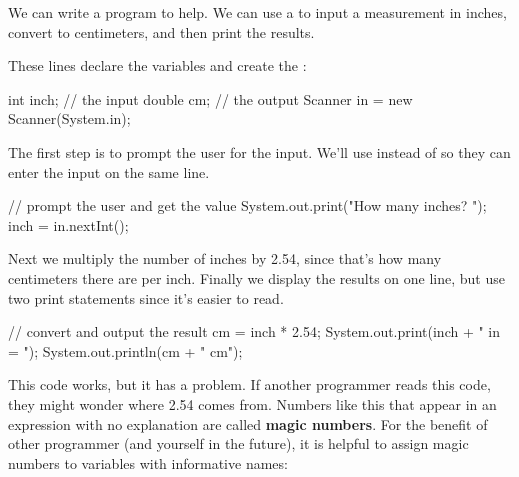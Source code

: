 
We can write a program to help.  We can use a  to 
input a measurement in inches, convert to centimeters, and then print
the results.

These lines declare the variables and create the :



\begin{code}
    int inch;  // the input
    double cm;  // the output
    Scanner in = new Scanner(System.in);
\end{code}

The first step is to prompt the user for the input.
We'll use  instead of  so they can enter the input on the same line.

\begin{code}
    // prompt the user and get the value
    System.out.print("How many inches? ");
    inch = in.nextInt();
\end{code}

Next we multiply the number of inches by 2.54, since that's how many centimeters there are per inch.
Finally we display the results on one line, but use two print statements since it's easier to read.

\begin{code}
    // convert and output the result
    cm = inch * 2.54;
    System.out.print(inch + " in = ");
    System.out.println(cm + " cm");
\end{code}


This code works, but it has a problem.  If another programmer reads
this code, they might wonder where 2.54 comes from.
Numbers like this that appear in an expression with no explanation are called {\bf magic numbers}.  For the benefit of other programmer (and yourself in the future), it is helpful to assign magic numbers to variables with informative names:

